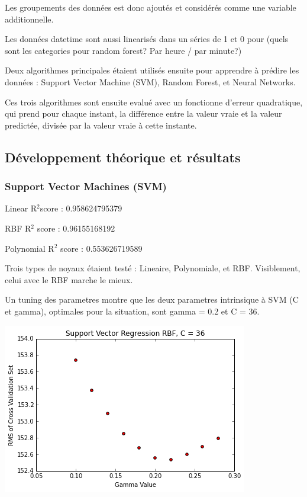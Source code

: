 \documentclass[a4paper]{article}
\begin{document}
\begin{multicols}{2}
Les groupements des données est donc ajoutés et considérés comme une variable additionnelle. 

Les données datetime sont aussi linearisés dans un séries de 1 et 0 pour (quels sont les categories pour random forest? Par heure / par minute?)

Deux algorithmes principales étaient utilisés ensuite pour apprendre à prédire les données : Support Vector Machine (SVM), Random Forest, et Neural Networks.

Ces trois algorithmes sont ensuite evalué avec un fonctionne d'erreur quadratique, qui prend pour chaque instant, la différence entre la valeur vraie et la valeur predictée, divisée par la valeur vraie à cette instante. 

\subsection{Développement théorique et résultats}
\subsubsection{Support Vector Machines (SVM)}

Linear R$^{2} $score : 0.958624795379

RBF R$^{2}$ score : 0.96155168192

Polynomial R$^{2}$ score : 0.553626719589

Trois types de noyaux étaient testé : Lineaire, Polynomiale, et RBF. Visiblement, celui avec le RBF marche le mieux.

Un tuning des parametres montre que les deux parametres intrinsique à SVM (C et gamma), optimales pour la situation, sont gamma = 0.2 et C = 36. 

\includegraphics[width=\textwidth/2]{./images/svmselectgamma.png}


\end{multicols}
\end{document}
